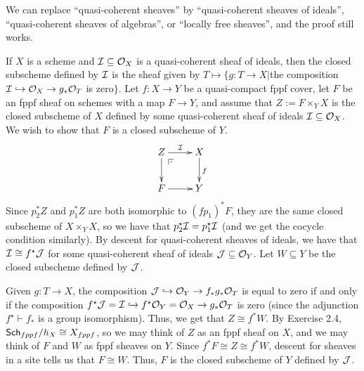 \begin{remark}\label{lec07R:descent_ideals,algebras,loc_frees}
 We can replace ``quasi-coherent sheaves'' by ``quasi-coherent sheaves of ideals'', ``quasi-coherent sheaves of algebras'', or ``locally free sheaves'', and the proof still works.
\end{remark}
\begin{example}\label{lec07E:descent_closed_subschemes}
 If $X$ is a scheme and $\mathcal{I}\subseteq \mathcal{O}_X$ is a quasi-coherent sheaf of ideals, then the closed subscheme defined by $\mathcal{I}$ is the sheaf given by $T\mapsto \{g:T\to X|$the composition $\mathcal{I}\hookrightarrow \mathcal{O}_X\to g_*\mathcal{O}_T$ is zero$\}$. Let $f:X\to Y$ be a quasi-compact fppf cover, let $F$ be an fppf sheaf on schemes with a map $F\to Y$, and assume that $Z:=F\times_Y X$ is the closed subscheme of $X$ defined by some quasi-coherent sheaf of ideals $\mathcal{I}\subseteq \mathcal{O}_X$. We wish to show that $F$ is a closed subscheme of $Y$.
 \[\xymatrix{
  Z\ar[r]^\I \ar[d]\ar@{}[dr]|(.25)\pb & X\ar[d]^f\\
  F\ar[r] & Y
 }\]
 Since $p_2^* Z$ and $p_1^* Z$ are both isomorphic to $(fp_1)^* F$, they are the same closed subscheme of $X\times_Y X$, so we have that $p_2^\star \mathcal{I}= p_1^\star \mathcal{I}$ (and we get the cocycle condition similarly). By descent for quasi-coherent sheaves of ideals, we have that $\mathcal{I}\cong f^\star \mathcal{J}$ for some quasi-coherent sheaf of ideals $\mathcal{J}\subseteq \mathcal{O}_Y$. Let $W\subseteq Y$ be the closed subscheme defined by $\mathcal{J}$.

 Given $g:T\to X$, the composition $\mathcal{J}\hookrightarrow \mathcal{O}_Y \to f_*g_*\mathcal{O}_T$ is equal to zero if and only if the composition $f^\star \mathcal{J}=\mathcal{I}\hookrightarrow f^\star \mathcal{O}_Y = \mathcal{O}_X\to g_*\mathcal{O}_T$ is zero (since the adjunction $f^\star \vdash f_*$ is a group isomorphism). Thus, we get that $Z\cong f^*W$. By Exercise 2.4, $\text{\sf Sch}_{fppf}/h_X \cong X_{fppf}$, so we may think of $Z$ as an fppf sheaf on $X$, and we may think of $F$ and $W$ as fppf sheaves on $Y$. Since $f^*F\cong Z\cong f^*W$, descent for sheaves in a site tells us that $F\cong W$. Thus, $F$ is the closed subscheme of $Y$ defined by $\mathcal{J}$.
\end{example}

